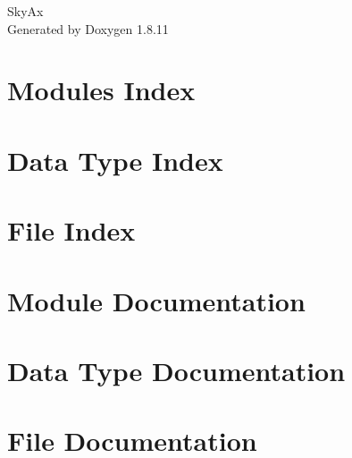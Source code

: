 \documentclass[twoside]{article}
\newcommand{\+}{\discretionary{\mbox{\scriptsize$\hookleftarrow$}}{}{}}
\newcommand{\clearemptydoublepage}{%
  \newpage{\pagestyle{empty}\cleardoublepage}%
}
\begin{document}
\hypersetup{pageanchor=false,
             bookmarksnumbered=true,
             pdfencoding=unicode
            }
\begin{titlepage}
\vspace*{7cm}
\begin{center}%
{\Large Sky\+Ax }\\
\vspace*{1cm}
{\large Generated by Doxygen 1.8.11}\\
\end{center}
\end{titlepage}
\tableofcontents
{}
\hypersetup{pageanchor=true}

\section{Modules Index}

\section{Data Type Index}

\section{File Index}

\section{Module Documentation}
















\section{Data Type Documentation}


\section{File Documentation}






















\newpage
{}



\newpage
{}
\clearemptydoublepage
{}
\printindex
\end{document}
